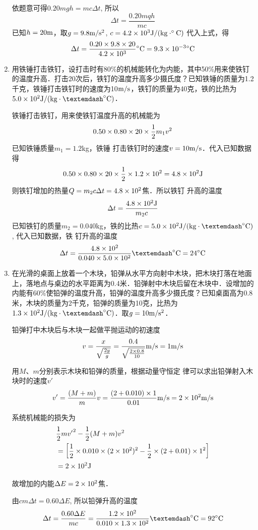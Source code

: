 \begin{enumerate}
\begin{solution}
    依题意可得$0.20mgh=mc\Delta t$, 所以
\[\Delta t =\frac{0.20mqh}{mc}\]
已知$h=20{\rm m}$，取$g=9.8{\rm m/s^2}$, $c=4.2\times10^3{\rm J/(kg\cdot^{\circ}C)}$
代入上式，得
\[\Delta t=\frac{0.20\times 9.8\times 20}{4.2\times 10^3}{\rm ^{\circ}C}=9.3\times 10^{-3}{\rm ^{\circ}C}\]
\end{solution}
\item 用铁锤打击铁钉，设打击时有80\%的机械能转化为内能，其中50\%用来使铁钉的温度升高．打击20次后，铁钉的温度升高多少摄氏度？已知铁锤的质量为1.2千克，铁锤打击铁钉时的速度为10${\rm m/s}$，铁钉的质量为40克，铁的比热为$5.0\times 10^2 {\rm J}/({\rm kg\cdot— ^\circ C})$．

\begin{solution}
铁锤打击铁钉，用来使铁钉温度升高的机械能为
\[0.50\times0.80\times20\times\frac{1}{2}m_1v^2\]
已知铁锤质量$m_1=1.2$kg，铁锤
打击铁钉时的速度$v=10{\rm m/s}$．代入已知数据得
\[0.50\times0.80\times20\times\frac{1}{2}\times1.2\times10^2=4.8\times10^2{\rm J}\]
则铁钉增加的热量$Q=m_2c\Delta t=4.8\times10^2$焦．所以铁钉
升高的温度\[\Delta t=\frac{4.8\times10^2{\rm J}}{m_2c}\]
已知铁钉的质量$m_2=0.040$kg，铁的比热$c=5.0\times 10^2 {\rm J}/({\rm kg\cdot— ^\circ C})$, 代入已知数据，铁
钉升高的温度
\[\Delta t=\frac{4.8\x10^2 }{0.040\x 5.0\x 10^2}—^{\circ}{\rm C}=24^{\circ}{\rm C}\]
\end{solution}
\item 在光滑的桌面上放着一个木块，铅弹从水平方向射中木块，把木块打落在地面上，落地点与桌边的水平距离为0.4米．铅弹射中木块后留在木块中．设增加的内能有60\%使铅弹的温度升高，铅弹的温度升高多少摄氏度？已知桌面高为0.8米，木块的质量为2千克，铅弹的质量为10克，比热为$1.3\times 10^2 {\rm J}/({\rm kg\cdot —^\circ C})$．取$g=10{\rm m}/{\rm s^2}$．

\begin{solution}
    铅弹打中木块后与木块一起做平抛运动的初速度
\[v=\frac{x}{\sqrt{\frac{2y}{g}}}=\frac{0.4}{\sqrt{\frac{2\times 0.8}{10}}}{\rm m/s}=1{\rm m/s}\]

用$M$、$m$分别表示木块和铅弹的质量，根据动量守恒定
律可以求出铅弹射入木块时的速度$v'$
\[v'=\frac{(M+m)}{m}v=\frac{(2+0.010)\times 1}{0.01}{\rm m/s}=2\times 10^2{\rm m/s}\]

系统机械能的损失为
\[\begin{split}
   & \frac{1}{2}{mv'}^2-\frac{1}{2}(M+m)v^2\\
&=\left[\frac{1}{2}\times 0.010\times(2\times10^2)^2-\frac{1}{2}\times(2+0.01)\times 1^2\right]\\
&=2\times 10^2 {\rm J}
\end{split}\]

故增加的内能$\Delta E=2\times10^2$焦．

由$cm\Delta t=0.60\Delta E$, 所以铅弹升高的温度
\[\Delta t=\frac{0.60\Delta E}{mc}=\frac{1.2\x10^2}{0.010\x 1.3\x 10^2}—^{\circ}{\rm C}={\rm 92^{\circ}C}\]
\end{solution}
\end{enumerate}


